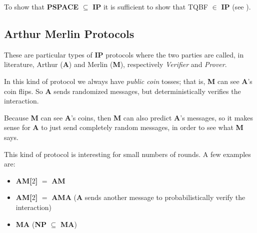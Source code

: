     To show that \textbf{PSPACE} $\subseteq$ \textbf{IP} it is sufficient to show that TQBF $\in$ \textbf{IP} (see ).


\subsection{Arthur Merlin Protocols}\label{subsec:arthur_merlin}
    These are particular types of \textbf{IP} protocols where the two parties are called, in literature, Arthur (\textbf{A}) and Merlin (\textbf{M}), respectively \textit{Verifier} and \textit{Prover}.
    
    In this kind of protocol we always have \textit{public coin} tosses; that is, \textbf{M} can see \textbf{A}'s coin flips.
    So \textbf{A} sends randomized messages, but deterministically verifies the interaction.

    Because \textbf{M} can see \textbf{A}'s coins, then \textbf{M} can also predict \textbf{A}'s messages, so it makes sense for \textbf{A} to just send completely random messages, in order to see what \textbf{M} says.

    This kind of protocol is interesting for small numbers of rounds.
    A few examples are:
    \begin{itemize}
        \item \textbf{AM[$2$]} $=$ \textbf{AM}
        \item \textbf{AM[$2$]} $=$ \textbf{AMA} (\textbf{A} sends another message to probabilistically verify the interaction)
        \item \textbf{MA} (\textbf{NP} $\subseteq$ \textbf{MA})
    \end{itemize}